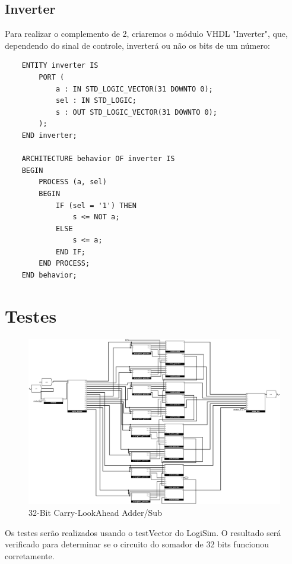 \documentclass[12pt]{article}
\begin{document}
\subsection{Inverter}

Para realizar o complemento de 2, criaremos o módulo VHDL "Inverter", que, dependendo do sinal de controle, inverterá ou não os bits de um número:

\begin{lstlisting}
    ENTITY inverter IS
        PORT (
            a : IN STD_LOGIC_VECTOR(31 DOWNTO 0);
            sel : IN STD_LOGIC;
            s : OUT STD_LOGIC_VECTOR(31 DOWNTO 0);
        );
    END inverter;
    
    ARCHITECTURE behavior OF inverter IS
    BEGIN
        PROCESS (a, sel)
        BEGIN
            IF (sel = '1') THEN
                s <= NOT a;
            ELSE
                s <= a;
            END IF;
        END PROCESS;
    END behavior;
\end{lstlisting}

\section{Testes}

\begin{figure}[h]
    \centering
    \includegraphics[scale=0.1875]{figures/32clas.png}
    \caption{32-Bit Carry-LookAhead Adder/Sub}
    \label{fig:32clas}
\end{figure}

Os testes serão realizados usando o testVector do LogiSim. O resultado será verificado para determinar se o circuito do somador de 32 bits funcionou corretamente.
\end{document}
